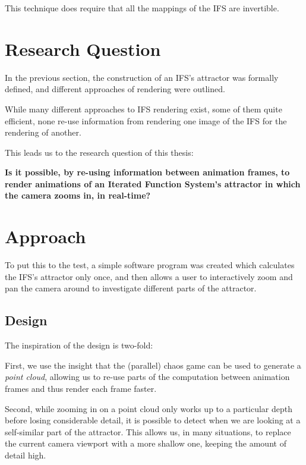 \documentclass[11pt]{article}
\begin{document}
This technique does require that all the mappings of the IFS are invertible.

\section{Research Question}
\label{sec:orgc952029}
\label{section:research_question}

In the previous section, the construction of an IFS's attractor was formally defined, 
and different approaches of rendering were outlined.

While many different approaches to IFS rendering exist, some of them quite efficient,
none re-use information from rendering one image of the IFS for the rendering of another.

This leads us to the research question of this thesis:

\textbf{\textbf{Is it possible, by re-using information between animation frames, 
to render animations of an Iterated Function System's attractor in which the camera zooms in, in real-time?}}

\section{Approach}
\label{sec:orgb6c8a1e}
\label{section:approach}

To put this to the test, a simple software program was created which calculates the IFS's attractor only once,
and then allows a user to interactively zoom and pan the camera around to investigate different parts of the attractor.

\subsection{Design}
\label{sec:org97de704}

The inspiration of the design is two-fold:

First, we use the insight that the (parallel) chaos game can be used to generate a \emph{point cloud}, allowing us to re-use parts of the computation between animation frames
and thus render each frame faster.

Second, while zooming in on a point cloud only works up to a particular depth before losing considerable detail, 
it is possible to detect when we are looking at a self-similar part of the attractor.
This allows us, in many situations, to replace the current camera viewport with a more shallow one, 
keeping the amount of detail high.
\end{document}
